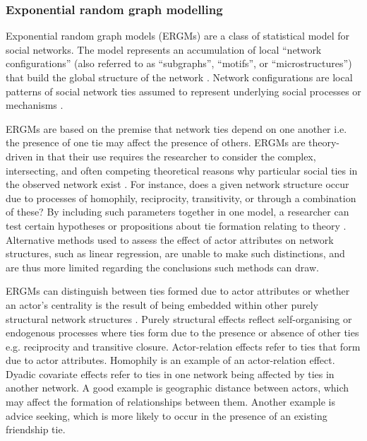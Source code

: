 \subsubsection{Exponential random graph modelling}

Exponential random graph models (ERGMs) are a class of statistical model for social networks. The model represents an accumulation of local \enquote{network configurations} (also referred to as \enquote{subgraphs}, \enquote{motifs}, or \enquote{microstructures}) that build the global structure of the network \citep{robins2013tutorial}. Network configurations are local patterns of social network ties assumed to represent underlying social processes or mechanisms \citep{lusher2013exponential}. \medskip

ERGMs are based on the premise that network ties depend on one another i.e. the presence of one tie may affect the presence of others. ERGMs are theory-driven in that their use requires the researcher to consider the complex, intersecting, and often competing theoretical reasons why particular social ties in the observed network exist \citep{lusher2013exponential}. For instance, does a given network structure occur due to processes of homophily, reciprocity, transitivity, or through a combination of these? By including such parameters together in one model, a researcher can test certain hypotheses or propositions about tie formation relating to theory \citep{robins2007recent}. Alternative methods used to assess the effect of actor attributes on network structures, such as linear regression, are unable to make such distinctions, and are thus more limited regarding the conclusions such methods can draw. \medskip

ERGMs can distinguish between ties formed due to actor attributes or whether an actor’s centrality is the result of being embedded within other purely structural network structures \citep{lusher2013exponential}. Purely structural effects reflect self-organising or endogenous processes where ties form due to the presence or absence of other ties e.g. reciprocity and transitive closure. Actor-relation effects refer to ties that form due to actor attributes. Homophily is an example of an actor-relation effect.  Dyadic covariate effects refer to ties in one network being affected by ties in another network. A good example is geographic distance between actors, which may affect the formation of relationships between them. Another example is advice seeking, which is more likely to occur in the presence of an existing friendship tie. \medskip

